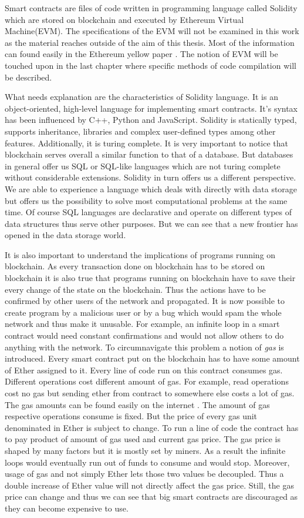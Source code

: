 \documentclass[a4paper,12pt,twoside,openany]{report}
\begin{document}
Smart contracts are files of code written in programming language called Solidity which are stored on blockchain and executed by Ethereum Virtual Machine(EVM). The specifications of the EVM will not be examined in this work as the material reaches outside of the aim of this thesis. Most of the information can found easily in the Ethereum yellow paper \cite{ethyellow}.  The notion of EVM will be touched upon in the last chapter where specific methods of code compilation will be described.

What needs explanation are the characteristics of Solidity language. It is an object-oriented, high-level language for implementing smart contracts. It's syntax has been influenced by C++, Python and JavaScript. Solidity is statically typed, supports inheritance, libraries and complex user-defined types among other features. Additionally, it is turing complete. It is very important to notice that blockchain serves overall a similar function to that of a database. But databases in general offer us SQL or SQL-like languages which are not turing complete without considerable extensions. Solidity in turn offers us a different perspective. We are able to experience a language which deals with directly with data storage but offers us the possibility to solve most computational problems at the same time. Of course SQL languages are declarative and operate on different types of data structures thus serve other purposes. But we can see that a new frontier has opened in the data storage world.

It is also important to understand the implications of programs running on blockchain. As every transaction done on blockchain has to be stored on blockchain it is also true that programs running on blockchain have to save their every change of the state on the blockchain. Thus the actions have to be confirmed by other users of the network and propagated. It is now possible to create program by a malicious user or by a bug which would spam the whole network and thus make it unusable. For example, an infinite loop in a smart contract would need constant confirmations and would not allow others to do anything with the network. To circumnavigate this problem a notion of \textit{gas} is introduced. Every smart contract put on the blockchain has to have some amount of Ether assigned to it. Every line of code run on this contract consumes gas. Different operations cost different amount of gas. For example, read operations cost no gas but sending ether from contract to somewhere else costs a lot of gas. The gas amounts can be found easily on the internet \cite{gas}.  The amount of gas respective operations consume is fixed. But the price of every gas unit denominated in Ether is subject to change. To run a line of code the contract has to pay product of amount of gas used and current gas price. The gas price is shaped by many factors but it is mostly set by miners. As a result the infinite loops would eventually run out of funds to consume and would stop. Moreover, usage of gas and not simply Ether lets those two values be decoupled. Thus a double increase of Ether value will not directly affect the gas price. Still, the gas price can change and thus we can see that big smart contracts are discouraged as they can become expensive to use. 
\end{document}
